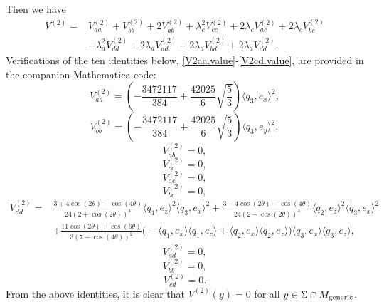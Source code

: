 \documentclass[11pt]{amsart}
\theoremstyle{definition}
\begin{document}
Then we have
\begin{align*}
V^{(2)}= &V^{(2)}_{aa}+V^{(2)}_{bb}+2V^{(2)}_{ab}+\lambda_c^2 V^{(2)}_{cc}+2\lambda_c V^{(2)}_{ac}+2\lambda_c V^{(2)}_{bc}\\
&+\lambda_{d}^2V^{(2)}_{dd}+2\lambda_d V^{(2)}_{ad}+2\lambda_d V^{(2)}_{bd}+2\lambda_d V^{(2)}_{dd}.    
\end{align*}
Verifications of the ten identities below, \eqref{V2aa.value}-\eqref{V2cd.value}, are provided in the companion Mathematica code:
\begin{equation}\label{V2aa.value}
V^{(2)}_{aa}=\left( -\frac{3472117}{384}+\frac{42025}{6}\sqrt{\frac{5}{3}} \right) \langle q_3,e_x\rangle^2,
\end{equation}
\begin{equation}\label{V2bb.value}
V^{(2)}_{bb}=\left( -\frac{3472117}{384}+\frac{42025}{6}\sqrt{\frac{5}{3}} \right) \langle q_3,e_y\rangle^2,
\end{equation}
\begin{equation}\label{V2ab.value}
V^{(2)}_{ab}=0,
\end{equation}
\begin{equation}\label{V2cc.value}
V^{(2)}_{cc}=0,  
\end{equation}
\begin{equation}\label{V2ac.value}
V^{(2)}_{ac}=0,  
\end{equation}
\begin{equation}\label{V2bc.value}
V^{(2)}_{bc}=0,  
\end{equation}
\begin{equation}\label{V2dd.value}
\begin{split}
V^{(2)}_{dd}=&\frac{3+4\cos(2\theta)-\cos(4\theta)}{24 (2+\cos(2\theta))^3}\langle q_1,e_z \rangle^2\langle q_3,e_x \rangle^2
+\frac{3-4\cos(2\theta)-\cos(4\theta)}{24 (2-\cos(2\theta))^3}\langle q_2,e_z \rangle^2\langle q_3,e_x \rangle^2\\
&+\frac{11\cos(2\theta)+\cos(6\theta)}{3(7-\cos(4\theta))^2}\big( -\langle q_1,e_x \rangle\langle q_1,e_z\rangle+ \langle q_2,e_x \rangle\langle q_2,e_z \rangle  \big)\langle q_3,e_x \rangle\langle q_3,e_z \rangle,
\end{split}
\end{equation}
\begin{equation}\label{V2ad.value}
V^{(2)}_{ad}=0,
\end{equation}
\begin{equation}\label{V2bd.value}
V^{(2)}_{bb}=0,
\end{equation}
\begin{equation}\label{V2cd.value}
V^{(2)}_{cd}=0.
\end{equation}
From the above identities, it is clear that $V^{(2)}(y)=0$ for all $y\in\Sigma\cap M_{\text{\rm generic}}$.
\end{document}

